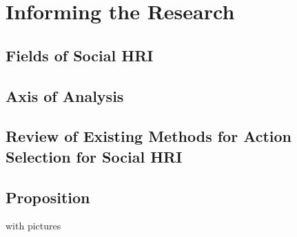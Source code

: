 \chapter{Informing the Research}

\section{Fields of Social HRI}

\section{Axis of Analysis}

\section{Review of Existing Methods for Action Selection for Social HRI}

\section{Proposition}


with pictures
